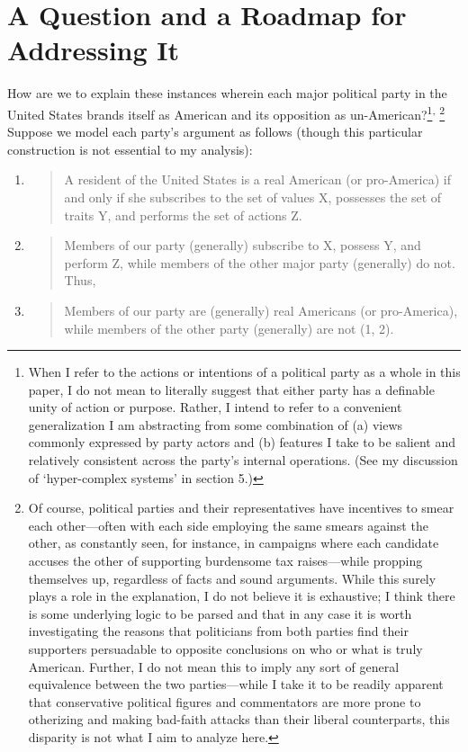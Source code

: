 \section{A Question and a Roadmap for Addressing
It}\label{a-question-and-a-roadmap-for-addressing-it}

How are we to explain these instances wherein each major political party
in the United States brands itself as American and its opposition as
un-American?\footnote{When I refer to the actions or intentions of a
  political party as a whole in this paper, I do not mean to literally
  suggest that either party has a definable unity of action or purpose.
  Rather, I intend to refer to a convenient generalization I am
  abstracting from some combination of (a) views commonly expressed by
  party actors and (b) features I take to be salient and relatively
  consistent across the party's internal operations. (See my discussion
  of `hyper-complex systems' in section 5.)}\textsuperscript{,}
\footnote{Of course, political parties and their representatives have
  incentives to smear each other---often with each side employing the
  same smears against the other, as constantly seen, for instance, in
  campaigns where each candidate accuses the other of supporting
  burdensome tax raises---while propping themselves up, regardless of
  facts and sound arguments. While this surely plays a role in the
  explanation, I do not believe it is exhaustive; I think there is some
  underlying logic to be parsed and that in any case it is worth
  investigating the reasons that politicians from both parties find
  their supporters persuadable to opposite conclusions on who or what is
  truly American. Further, I do not mean this to imply any sort of
  general equivalence between the two parties---while I take it to be
  readily apparent that conservative political figures and commentators
  are more prone to otherizing and making bad-faith attacks than their
  liberal counterparts, this disparity is not what I aim to analyze
  here.} Suppose we model each party's argument as follows (though this
particular construction is not essential to my analysis):

\begin{enumerate}
\def\labelenumi{(\arabic{enumi})}
\item
  \begin{quote}
  A resident of the United States is a real American (or pro-America) if
  and only if she subscribes to the set of values X, possesses the set
  of traits Y, and performs the set of actions Z.
  \end{quote}
\item
  \begin{quote}
  Members of our party (generally) subscribe to X, possess Y, and
  perform Z, while members of the other major party (generally) do not.
  Thus,
  \end{quote}
\item
  \begin{quote}
  Members of our party are (generally) real Americans (or pro-America),
  while members of the other party (generally) are not (1, 2).
  \end{quote}
\end{enumerate}

